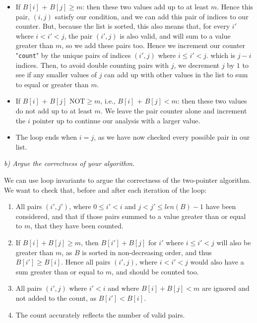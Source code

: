 \documentclass[12pt]{article}
\begin{document}
\begin{itemize}
    \item If $B[i]$ + $B[j] \ge m$: then these two values add up to at least $m$. Hence this pair, $(i, j)$ satisfy our condition, and we can add this pair of indices to our counter. But, because the list is sorted, this also means that, for every $i'$ where $i < i' < j$, the pair $(i', j)$ is also valid, and will sum to a value greater than $m$, so we add these pairs too. Hence we increment our counter "\texttt{count}" by the unique pairs of indices $(i', j)$ where $i \le i' < j$. which is $j-i$ indices. Then, to avoid double counting pairs with $j$, we decrement $j$ by $1$ to see if any smaller values of $j$ can add up with other values in the list to sum to equal or greater than $m$.
    \item If $B[i]$ + $B[j] \text{ NOT} \ge m \text{, i.e., }B[i]$ + $B[j] < m$: then these two values do not add up to at least $m$. We leave the pair counter alone and increment the $i$ pointer up to continue our analysis with a larger value.
    \item The loop ends when $i = j$, as we have now checked every possible pair in our list.
\end{itemize}

\textit{b) Argue the correctness of your algorithm.}

We can use loop invariants to argue the correctness of the two-pointer algorithm.  We want to check that, before and after each iteration of the loop:

\begin{enumerate}
    \item All pairs $(i', j')$, where $0 \le i' < i$ and $j < j' \le len(B) - 1$ have been considered, and that if those pairs summed to a value greater than or equal to $m$, that they have been counted.
    \item If $B[i] + B[j] \ge m$, then $B[i'] + B[j]$ for $i'$ where $i \le i' < j$ will also be greater than $m$, as $B$ is sorted in non-decreasing order, and thus $B[i'] \ge B[i]$. Hence all pairs $(i', j)$, where $i < i' < j$ would also have a sum greater than or equal to $m$, and should be counted too.
    \item All pairs $(i', j)$ where $i' < i$ and where $B[i] + B[j] < m$ are ignored and not added to the count, as $B[i'] < B[i]$.
    \item The count accurately reflects the number of valid pairs.
\end{enumerate}
\end{document}

